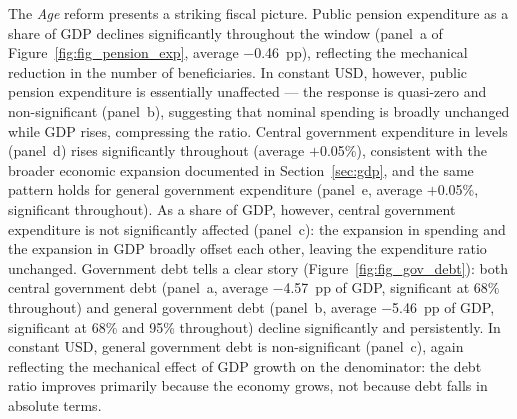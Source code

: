 \documentclass[11pt,english,a4paper, twoside, authoryear]{article}
\begin{document}
The \textit{Age} reform presents a striking fiscal picture. Public pension expenditure as a share of GDP declines significantly throughout the window (panel~a of Figure~\ref{fig:fig_pension_exp}, average $-$0.46~pp), reflecting the mechanical reduction in the number of beneficiaries. In constant USD, however, public pension expenditure is essentially unaffected --- the response is quasi-zero and non-significant (panel~b), suggesting that nominal spending is broadly unchanged while GDP rises, compressing the ratio. Central government expenditure in levels (panel~d) rises significantly throughout (average $+$0.05\%), consistent with the broader economic expansion documented in Section~\ref{sec:gdp}, and the same pattern holds for general government expenditure (panel~e, average $+$0.05\%, significant throughout).  As a share of GDP, however, central government expenditure is not significantly affected (panel~c): the expansion in spending and the expansion in GDP broadly offset each other, leaving the expenditure ratio unchanged. Government debt tells a clear story (Figure~\ref{fig:fig_gov_debt}): both central government debt (panel~a, average $-$4.57~pp of GDP, significant at 68\% throughout) and general government debt (panel~b, average $-$5.46~pp of GDP, significant at 68\% and 95\% throughout) decline significantly and persistently. In constant USD, general government debt is non-significant (panel~c), again reflecting the mechanical effect of GDP growth on the denominator: the debt ratio improves primarily because the economy grows, not because debt falls in absolute terms.



\end{document}
